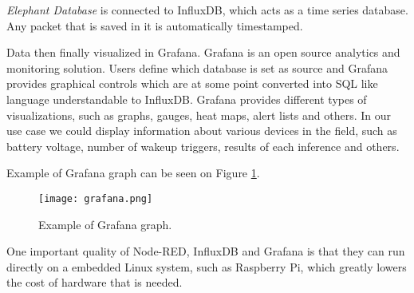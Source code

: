 \textit{Elephant Database} is connected to InfluxDB, which acts as a time series database.
Any packet that is saved in it is automatically timestamped.

Data then finally visualized in Grafana. 
Grafana is an open source analytics and monitoring solution.
Users define which database is set as source and Grafana provides graphical controls which are at some point converted into SQL like language understandable to InfluxDB.
Grafana provides different types of visualizations, such as graphs, gauges, heat maps, alert lists and others.
In our use case we could display information about various devices in the field, such as battery voltage, number of wakeup triggers, results of each inference and others.

Example of Grafana graph can be seen on Figure \ref{grafana}.

\begin{figure}[ht]
    \centering
    \texttt{[image: grafana.png]} 
    \caption{ Example of Grafana graph.}
    \label{grafana}
\end{figure}

One important quality of Node-RED, InfluxDB and Grafana is that they can run directly on a embedded Linux system, such as Raspberry Pi, which greatly lowers the cost of hardware that is needed.
